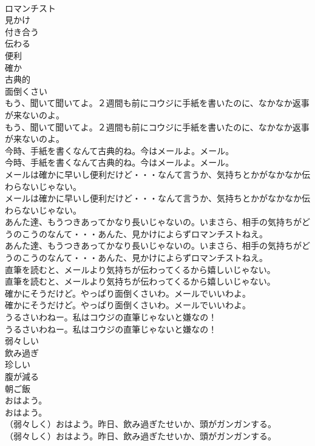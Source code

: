 \documentclass[8pt]{extreport}
\begin{document}
\begin{CJK}{UTF8}{min}
\\	ロマンチスト
\\	見かけ
\\	付き合う
\\	伝わる
\\	便利
\\	確か
\\	古典的
\\	面倒くさい
\\	もう、聞いて聞いてよ。２週間も前にコウジに手紙を書いたのに、なかなか返事が来ないのよ。	
\\	もう、聞いて聞いてよ。２週間も前にコウジに手紙を書いたのに、なかなか返事が来ないのよ。 
\\	今時、手紙を書くなんて古典的ね。今はメールよ。メール。	
\\	今時、手紙を書くなんて古典的ね。今はメールよ。メール。 
\\	メールは確かに早いし便利だけど・・・なんて言うか、気持ちとかがなかなか伝わらないじゃない。	
\\	メールは確かに早いし便利だけど・・・なんて言うか、気持ちとかがなかなか伝わらないじゃない。 
\\	あんた達、もうつきあってかなり長いじゃないの。いまさら、相手の気持ちがどうのこうのなんて・・・あんた、見かけによらずロマンチストねえ。	
\\	あんた達、もうつきあってかなり長いじゃないの。いまさら、相手の気持ちがどうのこうのなんて・・・あんた、見かけによらずロマンチストねえ。 
\\	直筆を読むと、メールより気持ちが伝わってくるから嬉しいじゃない。	
\\	直筆を読むと、メールより気持ちが伝わってくるから嬉しいじゃない。 
\\	確かにそうだけど。やっぱり面倒くさいわ。メールでいいわよ。	
\\	確かにそうだけど。やっぱり面倒くさいわ。メールでいいわよ。 
\\	うるさいわねー。私はコウジの直筆じゃないと嫌なの！	
\\	うるさいわねー。私はコウジの直筆じゃないと嫌なの！ 
\\	弱々しい
\\	飲み過ぎ
\\	珍しい
\\	腹が減る
\\	朝ご飯
\\	おはよう。	
\\	おはよう。 
\\	（弱々しく）おはよう。昨日、飲み過ぎたせいか、頭がガンガンする。	
\\	（弱々しく）おはよう。昨日、飲み過ぎたせいか、頭がガンガンする。 

\end{CJK}
\end{document}
